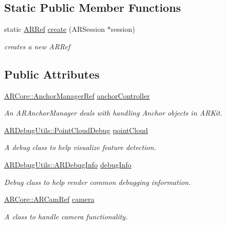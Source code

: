 \subsection*{Static Public Member Functions}
\begin{DoxyCompactItemize}
\item 
static \mbox{\hyperlink{_a_r_processor_8h_aa8c5643290d0692cc71388c3f0f1623a}{A\+R\+Ref}} \mbox{\hyperlink{class_a_r_processor_affa1cf36e94e3015c436fd30626dd773}{create}} (A\+R\+Session $\ast$session)
\begin{DoxyCompactList}\small\item\em creates a new A\+R\+Ref \end{DoxyCompactList}\end{DoxyCompactItemize}
\subsection*{Public Attributes}
\begin{DoxyCompactItemize}
\item 
\mbox{\hyperlink{namespace_a_r_core_a3f2b9ba00b51ce19c1010f554a66a512}{A\+R\+Core\+::\+Anchor\+Manager\+Ref}} \mbox{\hyperlink{class_a_r_processor_a8a1a8f16b30d2b0b4839a30d7ba4763d}{anchor\+Controller}}
\begin{DoxyCompactList}\small\item\em An A\+R\+Anchor\+Manager deals with handling Anchor objects in A\+R\+Kit. \end{DoxyCompactList}\item 
\mbox{\hyperlink{class_a_r_debug_utils_1_1_point_cloud_debug}{A\+R\+Debug\+Utils\+::\+Point\+Cloud\+Debug}} \mbox{\hyperlink{class_a_r_processor_a555e829fbf6b625537f6fd7cd9557002}{point\+Cloud}}
\begin{DoxyCompactList}\small\item\em A debug class to help visualize feature detection. \end{DoxyCompactList}\item 
\mbox{\hyperlink{class_a_r_debug_utils_1_1_a_r_debug_info}{A\+R\+Debug\+Utils\+::\+A\+R\+Debug\+Info}} \mbox{\hyperlink{class_a_r_processor_a6b7b4d5ac724bd93a7828759f7f6da4e}{debug\+Info}}
\begin{DoxyCompactList}\small\item\em Debug class to help render common debugging information. \end{DoxyCompactList}\item 
\mbox{\hyperlink{namespace_a_r_core_a4ebe9e23907235fcf76bf65440fde0e0}{A\+R\+Core\+::\+A\+R\+Cam\+Ref}} \mbox{\hyperlink{class_a_r_processor_a0df4995c56cb187db281726d7631d9ed}{camera}}
\begin{DoxyCompactList}\small\item\em A class to handle camera functionality. \end{DoxyCompactList}\end{DoxyCompactItemize}
